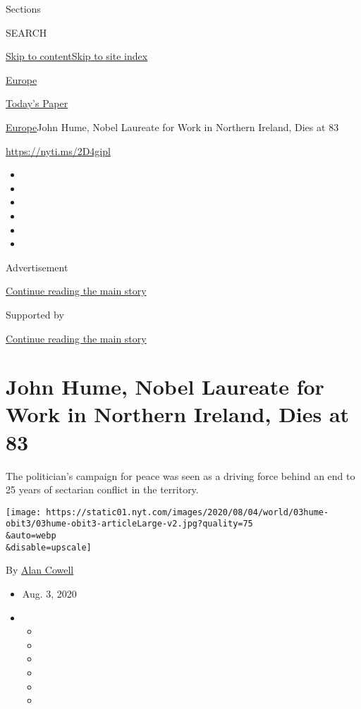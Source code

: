 Sections

SEARCH

\protect\hyperlink{site-content}{Skip to
content}\protect\hyperlink{site-index}{Skip to site index}

\href{https://www.nytimes.com/section/world/europe}{Europe}

\href{https://myaccount.nytimes.com/auth/login?response_type=cookie\&client_id=vi}{}

\href{https://www.nytimes.com/section/todayspaper}{Today's Paper}

\href{/section/world/europe}{Europe}\textbar{}John Hume, Nobel Laureate
for Work in Northern Ireland, Dies at 83

\url{https://nyti.ms/2D4gipl}

\begin{itemize}
\item
\item
\item
\item
\item
\item
\end{itemize}

Advertisement

\protect\hyperlink{after-top}{Continue reading the main story}

Supported by

\protect\hyperlink{after-sponsor}{Continue reading the main story}

\hypertarget{john-hume-nobel-laureate-for-work-in-northern-ireland-dies-at-83}{%
\section{John Hume, Nobel Laureate for Work in Northern Ireland, Dies at
83}\label{john-hume-nobel-laureate-for-work-in-northern-ireland-dies-at-83}}

The politician's campaign for peace was seen as a driving force behind
an end to 25 years of sectarian conflict in the territory.

\texttt{[image: https://static01.nyt.com/images/2020/08/04/world/03hume-obit3/03hume-obit3-articleLarge-v2.jpg?quality=75\\\&auto=webp\\\&disable=upscale]}

By \href{https://www.nytimes.com/by/alan-cowell}{Alan Cowell}

\begin{itemize}
\item
  Aug. 3, 2020
\item
  \begin{itemize}
  \item
  \item
  \item
  \item
  \item
  \item
  \end{itemize}
\end{itemize}


